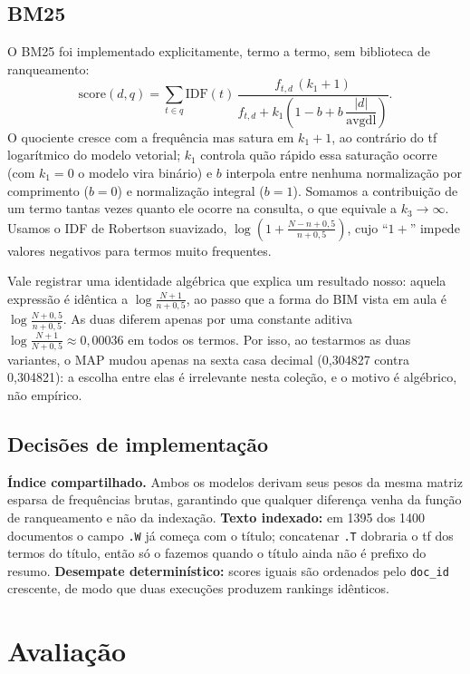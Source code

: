 \documentclass[10pt,twocolumn,a4paper]{article}
\begin{document}
\subsection{BM25}

O BM25 foi implementado explicitamente, termo a termo, sem biblioteca de
ranqueamento:
\[
  \mathrm{score}(d,q) = \sum_{t \in q}
  \mathrm{IDF}(t)\,
  \frac{f_{t,d}\,(k_1+1)}
       {f_{t,d} + k_1\!\left(1-b+b\,\dfrac{|d|}{\mathrm{avgdl}}\right)}.
\]
O quociente cresce com a frequência mas satura em $k_1+1$, ao contrário do tf
logarítmico do modelo vetorial; $k_1$ controla quão rápido essa saturação ocorre
(com $k_1 = 0$ o modelo vira binário) e $b$ interpola entre nenhuma normalização
por comprimento ($b = 0$) e normalização integral ($b = 1$). Somamos a
contribuição de um termo tantas vezes quanto ele ocorre na consulta, o que
equivale a $k_3 \to \infty$. Usamos o IDF de Robertson suavizado,
$\log\!\left(1 + \frac{N-n+0{,}5}{n+0{,}5}\right)$, cujo ``$1+$'' impede valores
negativos para termos muito frequentes.

Vale registrar uma identidade algébrica que explica um resultado nosso: aquela
expressão é idêntica a $\log\frac{N+1}{n+0{,}5}$, ao passo que a forma do BIM
vista em aula é $\log\frac{N+0{,}5}{n+0{,}5}$. As duas diferem apenas por uma
constante aditiva $\log\frac{N+1}{N+0{,}5} \approx 0{,}00036$ em todos os termos.
Por isso, ao testarmos as duas variantes, o MAP mudou apenas na sexta casa
decimal (0,304827 contra 0,304821): a escolha entre elas é irrelevante nesta
coleção, e o motivo é algébrico, não empírico.

\subsection{Decisões de implementação}

\textbf{Índice compartilhado.} Ambos os modelos derivam seus pesos da mesma
matriz esparsa de frequências brutas, garantindo que qualquer diferença venha da
função de ranqueamento e não da indexação. \textbf{Texto indexado:} em 1395 dos
1400 documentos o campo \texttt{.W} já começa com o título; concatenar
\texttt{.T} dobraria o tf dos termos do título, então só o fazemos quando o
título ainda não é prefixo do resumo. \textbf{Desempate determinístico:} scores
iguais são ordenados pelo \texttt{doc\_id} crescente, de modo que duas execuções
produzem rankings idênticos.

\section{Avaliação}
\end{document}
